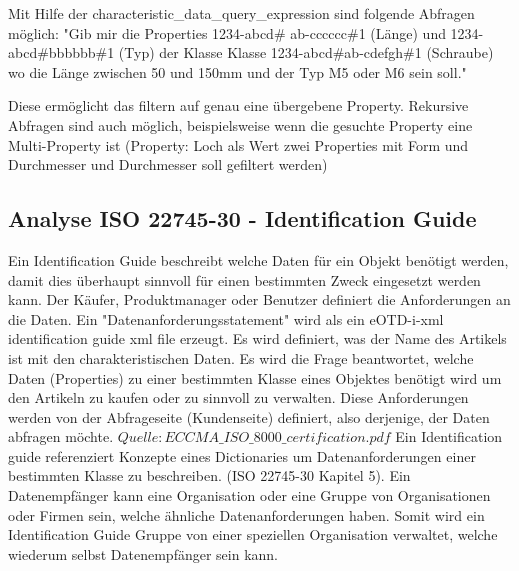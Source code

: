 Mit Hilfe der characteristic\_data\_query\_expression sind folgende Abfragen möglich: "Gib mir die Properties 1234-abcd\# ab-cccccc\#1 (Länge) und 1234-abcd\#bbbbbb\#1 (Typ) der Klasse Klasse 1234-abcd\#ab-cdefgh\#1 (Schraube) wo die Länge zwischen 50 und 150mm und der Typ M5 oder M6 sein soll."


Diese ermöglicht das filtern auf genau eine übergebene Property. Rekursive Abfragen sind auch möglich, beispielsweise wenn die gesuchte Property eine Multi-Property ist (Property: Loch als Wert zwei Properties mit Form und Durchmesser und Durchmesser soll gefiltert werden)

\subsection{Analyse ISO 22745-30 - Identification Guide}\label{kap:identification_guide}

Ein Identification Guide beschreibt welche Daten für ein Objekt benötigt werden, damit dies überhaupt sinnvoll für einen bestimmten Zweck eingesetzt werden kann. Der Käufer, Produktmanager oder Benutzer definiert die Anforderungen an die Daten. Ein "Datenanforderungsstatement" wird als ein eOTD-i-xml identification guide xml file erzeugt. Es wird definiert, was der Name des Artikels ist mit den charakteristischen Daten. Es wird die Frage beantwortet, welche Daten (Properties) zu einer bestimmten Klasse eines Objektes benötigt wird um den Artikeln zu kaufen oder zu sinnvoll zu verwalten. Diese Anforderungen werden von der Abfrageseite (Kundenseite) definiert, also derjenige, der Daten abfragen möchte. \(Quelle: ECCMA\_ISO\_8000\_certification.pdf\)
Ein Identification guide referenziert Konzepte eines Dictionaries um Datenanforderungen einer bestimmten Klasse zu beschreiben. (ISO 22745-30 Kapitel 5). 
Ein Datenempfänger kann eine Organisation oder eine Gruppe von Organisationen oder Firmen sein, welche ähnliche Datenanforderungen haben. Somit wird ein Identification Guide Gruppe von einer speziellen Organisation verwaltet, welche wiederum selbst Datenempfänger sein kann.  

